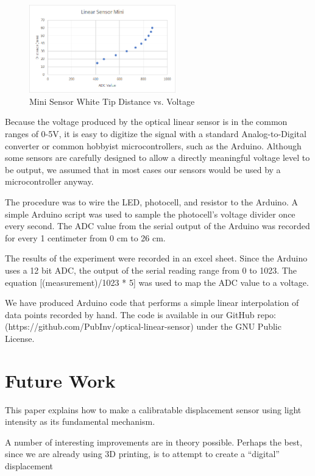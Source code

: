 \documentclass[10pt,conference,compsocconf]{IEEEtran}
\begin{document}
\begin{figure}
  \centering
  \includegraphics[width=2.5in]{figures/MiniDistanceVsRead.png}
  \caption{Mini Sensor White Tip Distance vs. Voltage}  
\end{figure}


Because the voltage produced by the optical linear sensor is in the common ranges of 0-5V, it is easy to digitize the signal with a standard Analog-to-Digital converter or common hobbyist microcontrollers, such as the Arduino. Although some sensors are carefully designed to allow a directly meaningful voltage level to be output, we assumed that in most cases our sensors would be used by a microcontroller anyway.

The procedure was to wire the LED, photocell, and resistor to the Arduino. A simple Arduino script was used to sample the photocell’s voltage divider once every second. The ADC value from the serial output of the Arduino was recorded for every 1 centimeter from 0 cm to 26 cm.

The results of the experiment were recorded in an excel sheet. Since the Arduino uses a 12 bit ADC, the output of the serial reading range from 0 to 1023. The equation [(measurement)/1023 * 5] was used to map the ADC value to a voltage. 

We have produced Arduino code that performs a simple linear interpolation of data points recorded by hand. The code is available in our GitHub repo: (https://github.com/PubInv/optical-linear-sensor) under the GNU Public License.

\section{Future Work}

This paper explains how to make a calibratable displacement sensor using light intensity as its fundamental mechanism.  

A number of interesting improvements are in theory possible. Perhaps the best, since we are already using 3D printing, is to attempt to create a “digital” displacement 
\end{document}

